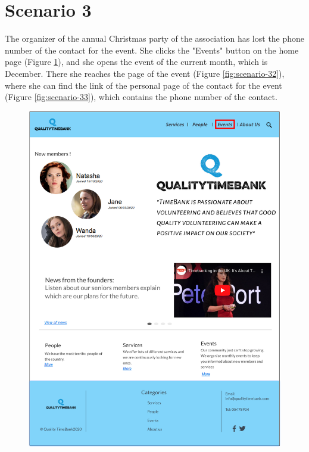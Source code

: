 \documentclass[a4paper, 11pt, parskip=half, headsepline]{scrreprt}
\begin{document}
\section{Scenario 3}

The organizer of the annual Christmas party of the association has lost the phone number of the contact for the event. She clicks the "Events" button on the home page (Figure \ref{fig:scenario-31}), and she opens the event of the current month, which is December. There she reaches the page of the event (Figure \ref{fig:scenario-32}), where she can find the link of the personal page of the contact for the event (Figure \ref{fig:scenario-33}), which contains the phone number of the contact.

\begin{figure}[H]
    \begin{minipage}[t]{0.5\textwidth}
        \centering
    	\includegraphics[width=0.9\linewidth, keepaspectratio]{scenarios/scenario-31}
    	\caption{}
    	\label{fig:scenario-31}
    \end{minipage}
    \hspace*{\fill}
    \begin{minipage}[t]{0.5\textwidth}

\end{minipage}
\end{figure}
\end{document}
